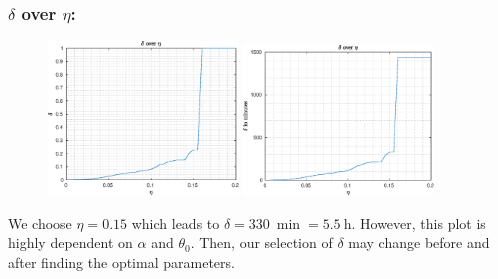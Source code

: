 \documentclass[aspectratio=169]{beamer}\usepackage[utf8]{inputenc}
\begin{document}
\begin{frame}\frametitle{$\delta$ over $\eta$:}

\begin{figure}[ht!]
\centering
\includegraphics[width=0.45\textwidth]{../../MATLAB_Files/Results/delta/eta.eps}
\includegraphics[width=0.45\textwidth]{../../MATLAB_Files/Results/delta/eta_min.eps}
\end{figure}
{\color{orange}We choose $\eta=0.15$ which leads to $\delta=\SI{330}{\min}=\SI{5.5}{\hour}$.} \alert{However, this plot is highly dependent on $\alpha$ and $\theta_0$. Then, our selection of $\delta$ may change before and after finding the optimal parameters.}
\end{frame}
\end{document}

